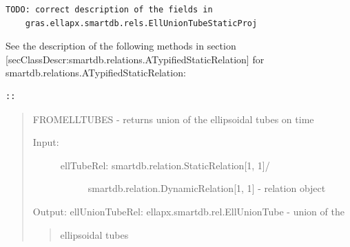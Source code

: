 \documentclass[letterpaper,10pt,english]{sphinxmanual}
\begin{document}
\begin{Verbatim}[commandchars=\\\{\}]
  TODO: correct description of the fields in
    gras.ellapx.smartdb.rels.EllUnionTubeStaticProj
\end{Verbatim}

See the description of the following methods in section
{[}secClassDescr:smartdb.relations.ATypifiedStaticRelation{]} for
smartdb.relations.ATypifiedStaticRelation:

\begin{Verbatim}[commandchars=\\\{\}]
::
\end{Verbatim}
\begin{quote}

FROMELLTUBES - returns union of the ellipsoidal tubes on time
\begin{description}
\item[{Input:}] \leavevmode\begin{description}
\item[{ellTubeRel: smartdb.relation.StaticRelation{[}1, 1{]}/}] \leavevmode
smartdb.relation.DynamicRelation{[}1, 1{]} - relation
object

\end{description}

\end{description}

Output:
ellUnionTubeRel: ellapx.smartdb.rel.EllUnionTube - union of the
\begin{quote}

ellipsoidal tubes
\end{quote}
\end{quote}
\end{document}
